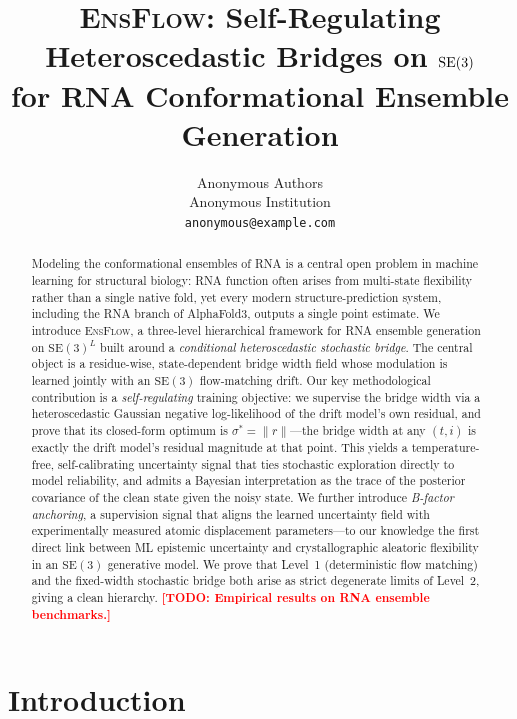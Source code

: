 \documentclass{article}
\title{\textsc{EnsFlow}: Self-Regulating Heteroscedastic Bridges on $\SE(3)$\\
for RNA Conformational Ensemble Generation}
\author{%
  Anonymous Authors\\
  Anonymous Institution\\
  \texttt{anonymous@example.com}%
}
\date{}
\theoremstyle{remark}
\theoremstyle{definition}
\newcommand{\SE}{\mathrm{SE}}
\newcommand{\todo}[1]{\textcolor{red}{\textbf{[TODO: #1]}}}
\begin{document}
\maketitle

\begin{abstract}
Modeling the conformational ensembles of RNA is a central open problem in
machine learning for structural biology: RNA function often arises from
multi-state flexibility rather than a single native fold, yet every modern
structure-prediction system, including the RNA branch of AlphaFold3, outputs
a single point estimate. We introduce \textsc{EnsFlow}, a three-level
hierarchical framework for RNA ensemble generation on $\SE(3)^L$ built around
a \emph{conditional heteroscedastic stochastic bridge}. The central object is
a residue-wise, state-dependent bridge width field whose modulation is learned
jointly with an $\SE(3)$ flow-matching drift. Our key methodological
contribution is a \emph{self-regulating} training objective: we supervise the
bridge width via a heteroscedastic Gaussian negative log-likelihood of the
drift model's own residual, and prove that its closed-form optimum is
$\sigma^{\ast}=\|r\|$---the bridge width at any $(t,i)$ is exactly the drift
model's residual magnitude at that point. This yields a temperature-free,
self-calibrating uncertainty signal that ties stochastic exploration directly
to model reliability, and admits a Bayesian interpretation as the trace of the
posterior covariance of the clean state given the noisy state. We further
introduce \emph{B-factor anchoring}, a supervision signal that aligns the
learned uncertainty field with experimentally measured atomic displacement
parameters---to our knowledge the first direct link between ML epistemic
uncertainty and crystallographic aleatoric flexibility in an $\SE(3)$
generative model. We prove that Level~1 (deterministic flow matching) and the
fixed-width stochastic bridge both arise as strict degenerate limits of Level~2,
giving a clean hierarchy. \todo{Empirical results on RNA ensemble benchmarks.}
\end{abstract}

\section{Introduction}
\label{sec:intro}
\end{document}
